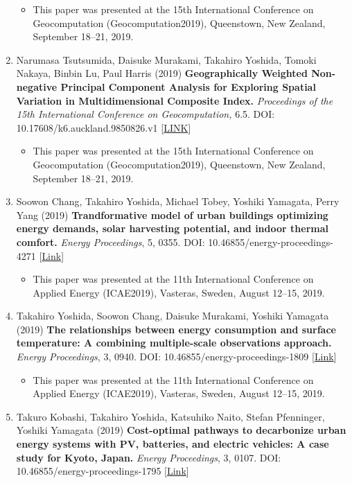 \documentclass[
]{book}
\providecommand{\tightlist}{%
  \setlength{\itemsep}{0pt}\setlength{\parskip}{0pt}}
\begin{document}
\begin{enumerate}
  \begin{itemize}
  \tightlist
  \item
    This paper was presented at the 15th International Conference on Geocomputation (Geocomputation2019), Queenstown, New Zealand, September 18--21, 2019.
  \end{itemize}
\item
  Narumasa Tsutsumida, Daisuke Murakami, Takahiro Yoshida, Tomoki Nakaya, Binbin Lu, Paul Harris (2019)
  \textbf{Geographically Weighted Non-negative Principal Component Analysis for Exploring Spatial Variation in Multidimensional Composite Index.}
  \emph{Proceedings of the 15th International Conference on Geocomputation,} 6.5.
  DOI: 10.17608/k6.auckland.9850826.v1 {[}\href{https://doi.org/10.17608/k6.auckland.9850826.v1}{LINK}{]}

  \begin{itemize}
  \tightlist
  \item
    This paper was presented at the 15th International Conference on Geocomputation (Geocomputation2019), Queenstown, New Zealand, September 18--21, 2019.
  \end{itemize}
\item
  Soowon Chang, Takahiro Yoshida, Michael Tobey, Yoshiki Yamagata, Perry Yang (2019)
  \textbf{Trandformative model of urban buildings optimizing energy demands, solar harvesting potential, and indoor thermal comfort.}
  \emph{Energy Proceedings}, 5, 0355.
  DOI: 10.46855/energy-proceedings-4271 {[}\href{https://doi.org/10.46855/energy-proceedings-4271}{Link}{]}

  \begin{itemize}
  \tightlist
  \item
    This paper was presented at the 11th International Conference on Applied Energy (ICAE2019), Vasteras, Sweden, August 12--15, 2019.
  \end{itemize}
\item
  Takahiro Yoshida, Soowon Chang, Daisuke Murakami, Yoshiki Yamagata (2019)
  \textbf{The relationships between energy consumption and surface temperature: A combining multiple-scale observations approach.}
  \emph{Energy Proceedings}, 3, 0940.
  DOI: 10.46855/energy-proceedings-1809 {[}\href{https://doi.org/10.46855/energy-proceedings-1809}{Link}{]}

  \begin{itemize}
  \tightlist
  \item
    This paper was presented at the 11th International Conference on Applied Energy (ICAE2019), Vasteras, Sweden, August 12--15, 2019.
  \end{itemize}
\item
  Takuro Kobashi, Takahiro Yoshida, Katsuhiko Naito, Stefan Pfenninger, Yoshiki Yamagata (2019)
  \textbf{Cost-optimal pathways to decarbonize urban energy systems with PV, batteries, and electric vehicles: A case study for Kyoto, Japan.}
  \emph{Energy Proceedings}, 3, 0107.
  DOI: 10.46855/energy-proceedings-1795 {[}\href{https://doi.org/10.46855/energy-proceedings-1795}{Link}{]}


\end{enumerate}
\end{document}
